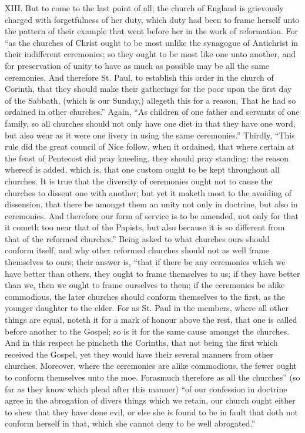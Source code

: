XIII. But to come to the last point of all; the church of England is grievously charged with forgetfulness of her duty, which duty had been to frame herself unto the pattern of their example that went before her in the work of reformation. For “as the churches of Christ ought to be most unlike the synagogue of Antichrist in their indifferent ceremonies; so they ought to be most like one unto another, and for preservation of unity to have as much as possible may be all the same ceremonies. And therefore St. Paul, to establish this order in the church of Corinth, that they should make their gatherings for the poor upon the first day of the Sabbath, (which is our Sunday,) allegeth this for a reason, That he had so ordained in other churches.” Again, “As children of one father and servants of one family, so all churches should not only have one diet in that they have one word, but also wear as it were one livery in using the same ceremonies.” Thirdly, “This rule did the great council of Nice follow, when it ordained, that where certain at the feast of Pentecost did pray kneeling, they should pray standing: the reason whereof is added, which is, that one custom ought to be kept throughout all churches. It is true that the diversity of ceremonies ought not to cause the churches to dissent one with another; but yet it maketh most to the avoiding of dissension, that there be amongst them an unity not only in doctrine, but also in ceremonies. And therefore our form of service is to be amended, not only for that it cometh too near that of the  Papists, but also because it is so different from that of the reformed churches.” Being asked to what churches ours should conform itself, and why other reformed churches should not as well frame themselves to ours; their answer is, “that if there be any ceremonies which we have better than others, they ought to frame themselves to us; if they have better than we, then we ought to frame ourselves to them; if the ceremonies be alike commodious, the later churches should conform themselves to the first, as the younger daughter to the elder. For as St. Paul in the members, where all other things are equal, noteth it for a mark of honour above the rest, that one is called before another to the Gospel; so is it for the same cause amongst the churches. And in this respect he pincheth the Corinths, that not being the first which received the Gospel, yet they would have their several manners from other churches. Moreover, where the ceremonies are alike commodious, the fewer ought to conform themselves unto the moe. Forasmuch therefore as all the churches” (so far as they know which plead after this manner) “of our confession in doctrine agree in the abrogation of divers things which we retain, our church ought either to shew that they have done evil, or else she is found to be in fault that doth not conform herself in that, which she cannot deny to be well abrogated.”

